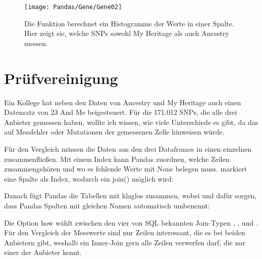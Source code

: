 \begin{figure}
\begin{center}	
	\texttt{[image: Pandas/Gene/Gene02]}
	
	\caption[Messung von SNPs bei My Heritage und Ancestry]{Die Funktion  berechnet ein Histogramme der Werte in einer Spalte. Hier zeigt sie, welche SNPs sowohl My Heritage als auch Ancestry messen.}
  \end{center}	
\end{figure}	
	

\section{Prüfvereinigung}

Ein Kollege hat neben den Daten von Ancestry und My Heritage auch einen Datensatz von 23 And Me beigesteuert. Für die 171.012 SNPs, die alle drei Anbieter gemessen haben, wollte ich wissen, wie viele Unterschiede es gibt, da das auf Messfehler oder Mutationen der gemessenen Zelle hinweisen würde.
	
Für den Vergleich müssen die Daten aus den drei Dataframes in einen einzelnen zusammenfließen. Mit einem Index kann Pandas zuordnen, welche Zeilen zusammengehören und wo es fehlende Werte mit None belegen muss.  markiert eine Spalte als Index, wodurch ein join() möglich wird:

\medskip





\medskip

Danach fügt Pandas die Tabellen mit  klaglos zusammen, wobei  und  dafür sorgen, dass Pandas Spalten mit ­gleichen Namen automatisch umbenennt:

\medskip



\medskip

Die Option how wählt zwischen den vier von SQL bekannten Join-Typen , ,  und . Für den Vergleich der Messwerte sind nur Zeilen interessant, die es bei beiden Anbietern gibt, weshalb ein Inner-Join gern alle Zeilen verwerfen darf, die nur einer der Anbieter kennt.
	
